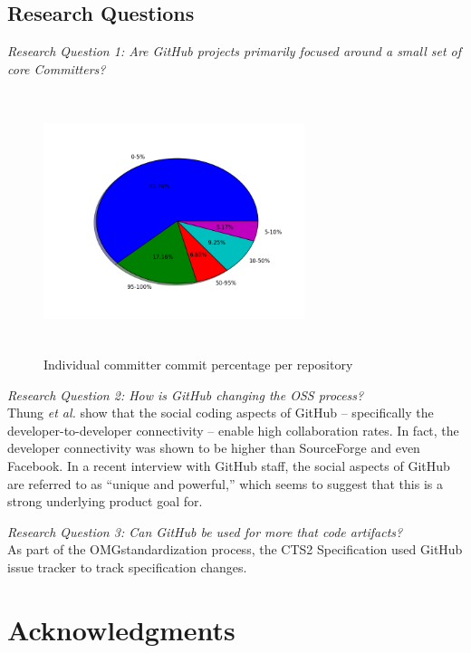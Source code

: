 \documentclass{proc}
\begin{document}
\subsection{Research Questions}
\emph{Research Question 1: Are GitHub projects primarily focused around a small set of core Committers?}\\
\begin{figure}
\includegraphics[height=3in,width=3in]{images/committers_percentage_pie_chart.png}
\caption{Individual committer commit percentage per repository}
\end{figure}

\emph{Research Question 2: How is GitHub changing the OSS process?}\\
Thung \textit{et al.} show that the social coding aspects of GitHub -- specifically the developer-to-developer connectivity -- enable high collaboration rates.\cite{thung2013network} In fact, the developer connectivity was shown to be higher than SourceForge and even Facebook. In a recent interview with GitHub staff, the social aspects of GitHub are referred to as ``unique and powerful\cite{begel2013social},'' which seems to suggest that this is a strong underlying product goal for.

\emph{Research Question 3: Can GitHub be used for more that code artifacts?}\\
As part of the OMG\textregistered standardization process, the CTS2 Specification used GitHub issue tracker to track specification changes.

\section{Acknowledgments}



\end{document}
